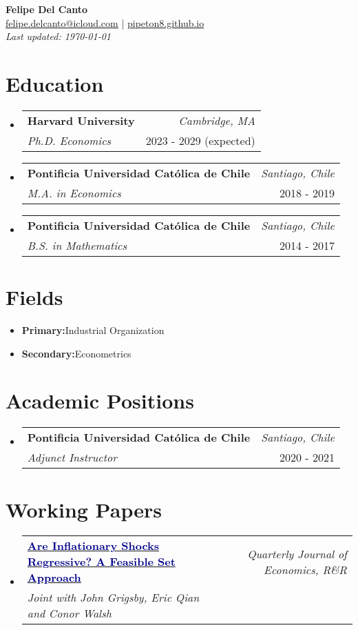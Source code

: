 \documentclass[a4paper,11pt]{article}
\makeatletter
\newcommand{\resumeItem}[2]{
  \item[]{
    \textbf{#1}{\hspace{0.5mm}#2 \vspace{-0.5mm}}
  }
}
\newcommand{\resumeSubheading}[4]{
\vspace{0.5mm}\item[]
    \begin{tabular*}{0.98\textwidth}[t]{l@{\extracolsep{\fill}}r}
        \textbf{#1} & \textit{\footnotesize{#2}} \\
        \textit{\footnotesize{#3}} &  \footnotesize{#4}\\
    \end{tabular*}
    \vspace{-1ex}
}
\newcommand{\resumeSubItem}[2]{\resumeItem{#1}{#2}\vspace{-4pt}}
\newcommand{\resumeSubHeadingListStart}{\begin{itemize}[leftmargin=*,labelsep=1mm]}
\newcommand{\resumeHeadingSkillStart}{\begin{itemize}[leftmargin=*,itemsep=1.7mm, rightmargin=2ex]}
\newcommand{\ListEnd}{\end{itemize}\vspace{-2mm}}
\newcommand{\headerfontiii}{\fontfamily{ppl}\selectfont} %
\makeatother
\begin{document}
\headerfontiii

\begin{center}
    {\Huge\textbf{Felipe Del Canto}} \\[1ex]

	\small{
    \href{mailto:felipe.delcanto@icloud.com}{felipe.delcanto@icloud.com} | 
    \href{https://pipeton8.github.io/}{pipeton8.github.io} \\[1ex]
	\textit{Last updated: \monthyeardate\today}
    }
\end{center}

\section{\textbf{Education}}
\resumeSubHeadingListStart
	\resumeSubheading
	{Harvard University}{Cambridge, MA}
	{Ph.D. Economics}{2023 - 2029 (expected)}

	\resumeSubheading
	{Pontificia Universidad Católica de Chile}{Santiago, Chile}
	{M.A. in Economics}{2018 - 2019}

	\resumeSubheading
	{Pontificia Universidad Católica de Chile}{Santiago, Chile}
	{B.S. in Mathematics}{2014 - 2017}
\ListEnd

\section{\textbf{Fields}}
\resumeHeadingSkillStart
	\resumeSubItem{Primary:}
	{Industrial Organization}
	\resumeSubItem{Secondary:}{Econometrics}
\ListEnd

\section{\textbf{Academic Positions}}
\resumeSubHeadingListStart
	\resumeSubheading
	{Pontificia Universidad Católica de Chile}{Santiago, Chile}
	{Adjunct Instructor}{2020 - 2021}
\ListEnd

\section{\textbf{Working Papers}}

\resumeSubHeadingListStart
	\resumeSubheading
	{\href{https://www.dropbox.com/scl/fi/yhdiyv3n0waeib74tnrnu/InflationRegressivity.pdf?rlkey=t9x4sb14h9fg0hzvvtp8855j2}{\textcolor{darkblue}{Are Inflationary Shocks Regressive? A Feasible Set Approach}}}
	{Quarterly Journal of Economics, R\&R}
	{Joint with John Grigsby, Eric Qian and Conor Walsh}
	{}
\ListEnd
\end{document}
